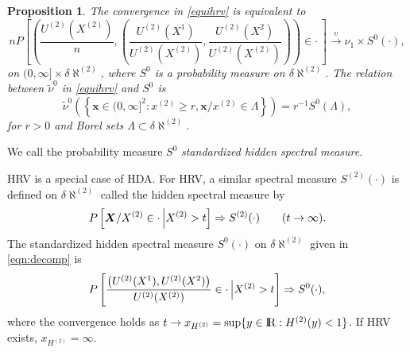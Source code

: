 \documentclass[11 pt]{amsart}
\newtheorem{prop}[thm]{Proposition}
\numberwithin{equation}{section}
\begin{document}
\begin{prop}\label{prop:decomp}
{{ The convergence in \eqref{equihrv} is equivalent to
\begin{equation}\label{eqn:decomp}
nP\left[ \left( \frac{U^{(2)}\left(X^{(2)}\right)}{n} , \left(
      \frac{U^{(2)}(X^1)}{U^{(2)}(X^{(2)})},
      \frac{U^{(2)}(X^2)}{U^{(2)}(X^{(2)})} \right) \right) \in \cdot \,
\right] \stackrel{v}{\rightarrow} \nu_1 \times  S^0(\cdot), 
\end{equation}
on $(0, \infty] \times \delta \aleph^{(2)}$, where  $S^0$ is a probability measure on $\delta
\aleph^{(2)}$. The relation between $\tilde \nu^0$  in
\eqref{equihrv} and $S^0$ is 
 \begin{equation}\label{tildenu0ands0}
 \tilde \nu^0 \left( \left \{ {\boldsymbol x} \in (0, \infty]^2 : x^{(2)} \ge r, {\boldsymbol x}/x^{(2)} \in \Lambda \right \} \right) = r^{-1} S^0(\Lambda),
 \end{equation}
for  $r >0$ and Borel sets $\Lambda \subset \delta \aleph^{(2)}$.
}}
\end{prop}

We call the probability measure $S^0$ {\it standardized
hidden spectral measure\/}.

HRV is a special case of HDA. For  HRV, a similar spectral
measure $S^{(2)}(\cdot)$ is defined \citep{mitra:resnick:2010a} 
on $\delta \aleph^{(2)}$
called {the} hidden spectral measure by
\begin{align*}
P\left[ {\boldsymbol X}/{X^{(2)}} \in \cdot \,\Big{|} X^{(2)} > t \right]
\Rightarrow S^{(2)}(\cdot) \qquad {(t\to\infty).}
\end{align*}
 {The standardized hidden spectral
  measure $S^0(\cdot)$ on $\delta \aleph^{(2)}$ given in 
 \eqref{eqn:decomp} is}
\begin{align}\label{eqn:s0interpret}
P\left[  \frac{ \left(U^{(2)}(X^1), U^{(2)}(X^2)
    \right)}{U^{(2)}(X^{(2)})} \in \cdot \, \Big{|} X^{(2)} > t \right]
\Rightarrow S^0(\cdot),
\end{align}
where the convergence holds as $t \to
x_{H^{(2)}} = \sup \{ y \in {\mathop{\rm I\kern -0.20em R}\nolimits}: H^{(2)}(y) < 1 \} $.  If HRV exists,
$x_{H^{(2)}} = \infty$. 
\end{document}
